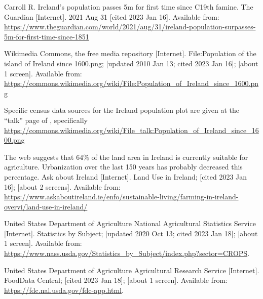 \documentclass[12pt]{iopart}
\begin{document}
\begin{thebibliography}{99}
Carroll R.
Ireland’s population passes 5m for first time since C19th famine.
The Guardian [Internet].
2021 Aug 31 [cited 2023 Jan 16].
Available from: \url{https://www.theguardian.com/world/2021/aug/31/ireland-population-surpasses-5m-for-first-time-since-1851}

Wikimedia Commons, the free media repository [Internet].
File:Population of the island of Ireland since 1600.png;
[updated 2010 Jan 13; cited 2023 Jan 16]; [about 1 screen].
Available from: \url{https://commons.wikimedia.org/wiki/File:Population\_of\_Ireland\_since\_1600.png}

Specific census data sources for the Ireland population plot are given at the ``talk'' page of \cite{pop_image}, specifically
\url{https://commons.wikimedia.org/wiki/File\_talk:Population\_of\_Ireland\_since\_1600.png}

The web suggests that $64\%$ of the land area in Ireland is currently suitable for agriculture.  Urbanization over the last 150 years has probably decreased this percentage.  
Ask about Ireland [Internet].
Land Use in Ireland; [cited 2023 Jan 16]; [about 2 screens].
Available from: \url{https://www.askaboutireland.ie/enfo/sustainable-living/farming-in-ireland-overvi/land-use-in-ireland/}

United States Department of Agriculture National Agricultural Statistics Service [Internet].
Statistics by Subject; [updated 2020 Oct 13; cited 2023 Jan 18]; [about 1 screen].
Available from: \url{https://www.nass.usda.gov/Statistics_by_Subject/index.php?sector=CROPS}.  

United States Department of Agriculture Agricultural Research Service [Internet].
FoodData Central; [cited 2023 Jan 18]; [about 1 screen].
Available from: \url{https://fdc.nal.usda.gov/fdc-app.html}.  


\end{thebibliography}
\end{document}
